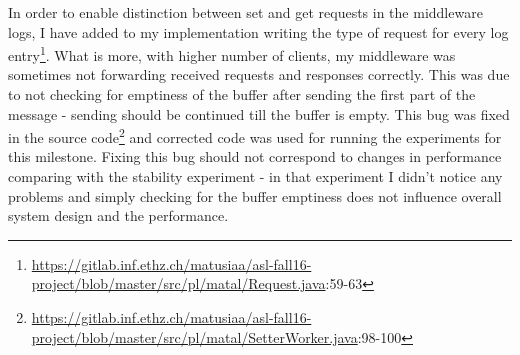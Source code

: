 \documentclass[11pt]{article}
\begin{document}
In order to enable distinction between set and get requests in the middleware logs, I have added to my implementation writing the type of request for every log entry\footnote{\url{https://gitlab.inf.ethz.ch/matusiaa/asl-fall16-project/blob/master/src/pl/matal/Request.java}:59-63}. What is more, with higher number of clients, my middleware was sometimes not forwarding received requests and responses correctly. This was due to not checking for emptiness of the buffer after sending the first part of the message - sending should be continued till the buffer is empty. This bug was fixed in the source code\footnote{\url{https://gitlab.inf.ethz.ch/matusiaa/asl-fall16-project/blob/master/src/pl/matal/SetterWorker.java}:98-100} and corrected code was used for running the experiments for this milestone. Fixing this bug should not correspond to changes in performance comparing with the stability experiment - in that experiment I didn't notice any problems and simply checking for the buffer emptiness does not influence overall system design and the performance.
 
\end{document}
